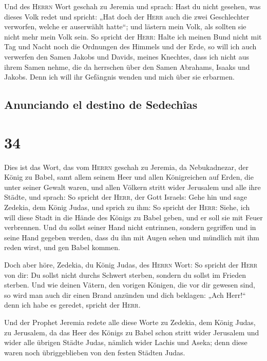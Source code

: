  Und des \textsc{Herrn} Wort geschah zu Jeremia und
sprach:  Hast du nicht gesehen, was dieses Volk redet und
spricht: „Hat doch der \textsc{Herr} auch die zwei Geschlechter
verworfen, welche er auserwählt hatte``; und lästern mein Volk, als
sollten sie nicht mehr mein Volk sein.  So spricht der
\textsc{Herr}: Halte ich meinen Bund nicht mit Tag und Nacht noch die
Ordnungen des Himmels und der Erde,  so will ich auch
verwerfen den Samen Jakobs und Davids, meines Knechtes, dass ich nicht
aus ihrem Samen nehme, die da herrschen über den Samen Abrahams, Isaaks
und Jakobs. Denn ich will ihr Gefängnis wenden und mich über sie
erbarmen.

\hypertarget{anunciando-el-destino-de-sedechuxeeas}{%
\subsection{Anunciando el destino de
Sedechîas}\label{anunciando-el-destino-de-sedechuxeeas}}

\hypertarget{section-33}{%
\section{34}\label{section-33}}

 Dies ist das Wort, das vom \textsc{Herrn} geschah zu
Jeremia, da Nebukadnezar, der König zu Babel, samt allem seinem Heer und
allen Königreichen auf Erden, die unter seiner Gewalt waren, und allen
Völkern stritt wider Jerusalem und alle ihre Städte, und sprach:
 So spricht der \textsc{Herr}, der Gott Israels: Gehe hin
und sage Zedekia, dem König Judas, und sprich zu ihm: So spricht der
\textsc{Herr}: Siehe, ich will diese Stadt in die Hände des Königs zu
Babel geben, und er soll sie mit Feuer verbrennen.  Und du
sollst seiner Hand nicht entrinnen, sondern gegriffen und in seine Hand
gegeben werden, dass du ihn mit Augen sehen und mündlich mit ihm reden
wirst, und gen Babel kommen.

 Doch aber höre, Zedekia, du König Judas, des
\textsc{Herrn} Wort: So spricht der \textsc{Herr} von dir: Du sollst
nicht durchs Schwert sterben,  sondern du sollst im
Frieden sterben. Und wie deinen Vätern, den vorigen Königen, die vor dir
gewesen sind, so wird man auch dir einen Brand anzünden und dich
beklagen: „Ach Herr!{}`` denn ich habe es geredet, spricht der
\textsc{Herr}.

 Und der Prophet Jeremia redete alle diese Worte zu
Zedekia, dem König Judas, zu Jerusalem,  da das Heer des
Königs zu Babel schon stritt wider Jerusalem und wider alle übrigen
Städte Judas, nämlich wider Lachis und Aseka; denn diese waren noch
übriggeblieben von den festen Städten Judas.

